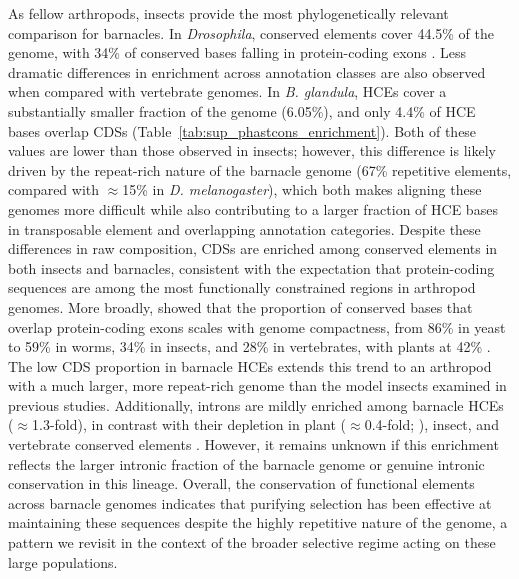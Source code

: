 \documentclass[11pt]{article}
\newcommand{\bgla}{\textit{B. glandula}\xspace}
\begin{document}
As fellow arthropods, insects provide the most phylogenetically relevant comparison for
barnacles.
In \textit{Drosophila}, conserved elements cover 44.5\% of the genome, with 34\% of
conserved bases falling in protein-coding exons \citep{siepel_evolutionarily_2005}.
Less dramatic differences in enrichment across annotation classes are also observed when
compared with vertebrate genomes.
In \bgla{}, HCEs cover a substantially smaller fraction of the genome (6.05\%), and only
4.4\% of HCE bases overlap CDSs (Table~\ref{tab:sup_phastcons_enrichment}).
Both of these values are lower than those observed in insects; however, this difference is
likely driven by the repeat-rich nature of the barnacle genome (67\% repetitive elements,
compared with $\approx$15\% in \textit{D. melanogaster}), which both makes aligning these
genomes more difficult while also contributing to a larger fraction of HCE bases in
transposable element and overlapping annotation categories.
Despite these differences in raw composition, CDSs are enriched among conserved elements
in both insects and barnacles, consistent with the expectation that protein-coding
sequences are among the most functionally constrained regions in arthropod genomes.
More broadly, \cite{siepel_evolutionarily_2005} showed that the proportion of conserved
bases that overlap protein-coding exons scales with genome compactness, from 86\% in
yeast to 59\% in worms, 34\% in insects, and 28\% in vertebrates, with plants at 42\%
\citep{hupalo_conservation_2013}.
The low CDS proportion in barnacle HCEs extends this trend to an arthropod with a much
larger, more repeat-rich genome than the model insects examined in previous studies.
Additionally, introns are mildly enriched among barnacle HCEs
($\approx$1.3-fold), in contrast with their depletion in plant ($\approx$0.4-fold;
\citealp{hupalo_conservation_2013}), insect, and vertebrate conserved elements
\citep{siepel_evolutionarily_2005}.
However, it remains unknown if this enrichment reflects the larger intronic fraction
of the barnacle genome or genuine intronic conservation in this lineage.
Overall, the conservation of functional elements across barnacle genomes indicates
that purifying selection has been effective at maintaining these sequences despite
the highly repetitive nature of the genome, a pattern we revisit in the context
of the broader selective regime acting on these large populations.
\end{document}

